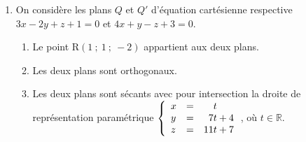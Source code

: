 \documentclass[10pt]{article}
\providecommand{\R}{\mathbb{R}}
\begin{document}
\begin{enumerate}
\item On considère les plans $Q$ et $Q'$ d'équation cartésienne respective $3x - 2y + z + 1 = 0$ et $4x + y - z + 3 = 0$.
	\begin{enumerate}
		\item Le point R$(1~;~1~;~-2)$ appartient aux deux plans.
		\item Les deux plans sont orthogonaux.
		\item Les deux plans sont sécants avec pour intersection la droite de représentation
paramétrique $\left\{\begin{array}{l c l}
x&=& \phantom{17}t\\
y& =& \phantom{1}7t + 4 \\
z& =& 11t + 7
\end{array}\right.$, où $t \in \R$.
		\end{enumerate}
\end{enumerate}

\vspace{0,5cm}
\end{document}
